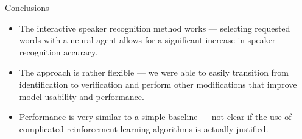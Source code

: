 \documentclass[11pt, aspectratio=169]{beamer}
\begin{document}
\begin{frame}{Conclusions}
    \begin{itemize}
        \item The interactive speaker recognition method works --- selecting
        requested words with a neural agent allows for a significant increase
        in speaker recognition accuracy.
        \item The approach is rather flexible --- we were able to easily
        transition from identification to verification and perform other
        modifications that improve model usability and performance.
        \item Performance is very similar to a simple baseline --- not clear if
        the use of complicated reinforcement learning algorithms is actually
        justified.
    \end{itemize}
\end{frame}
\end{document}
